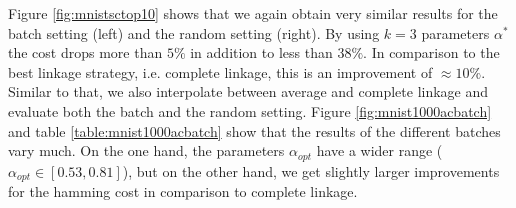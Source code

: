 Figure \ref{fig:mnistsctop10} shows that we again obtain very similar results for the batch setting (left) and the random setting (right). By using $k = 3$ parameters $\alpha^*$ the cost drops more than $5\%$ in addition to less than $38\%$. In comparison to the best linkage strategy, i.e. complete linkage, this is an improvement of $\approx 10\%$.\\

Similar to that, we also interpolate between average and complete linkage and evaluate both the batch and the random setting. Figure \ref{fig:mnist1000acbatch} and table \ref{table:mnist1000acbatch} show that the results of the different batches vary much. On the one hand, the parameters $\alpha_{opt}$ have a wider range ($\alpha_{opt} \in [0.53,0.81]$), but on the other hand, we get slightly larger improvements for the hamming cost in comparison to complete linkage.

